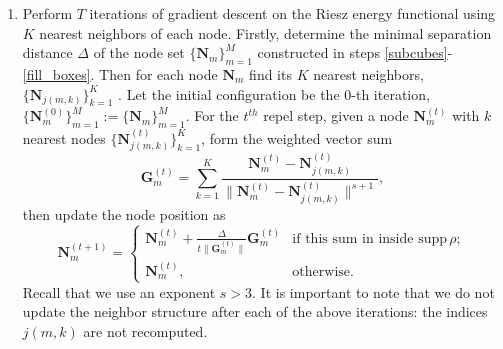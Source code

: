 \documentclass{amsart}
\newcommand{\bs}[1]{\boldsymbol{#1}}
\theoremstyle{definition}
\begin{document}
\begin{enumerate}
	\item Perform $ T $ iterations of gradient descent on the Riesz energy functional using $ K $ nearest neighbors of each node. 
	Firstly, determine the minimal separation distance $ \Delta $ of the node set $ \{\boldsymbol{N}_m\}_{m=1}^M $ constructed in steps \eqref{subcubes}-\eqref{fill_boxes}. Then for each node $ \boldsymbol{N}_m $ find its $ K $ nearest neighbors, $ \{\boldsymbol{N}_{j(m,k)}\}_{k=1}^K $ . Let the initial configuration be the $ 0 $-th iteration, $ \{\boldsymbol{N}_m^{(0)}\}_{m=1}^M := \{\boldsymbol{N}_m\}_{m=1}^M $. For the $t^{th}$ repel step, given a node $\boldsymbol{N}_m^{(t)}$ with $ k $ nearest nodes $\{ \boldsymbol{N}_{j(m,k)}^{(t)}\}_{k=1}^K$, form the weighted vector sum
	\[ \bs{G}_m^{(t)} =\sum_{k=1}^{K}\frac{\boldsymbol{N}_m^{(t)}-\boldsymbol{N}_{j(m,k)}^{(t)} }{\|\boldsymbol{N}_m^{(t)}-\boldsymbol{N}_{j(m,k)}^{(t)} \|^{s+1}}, \]
	then update the node position as
	\begin{equation}\label{node_update}
	\boldsymbol{N}_m^{(t+1)} = \begin{cases}
	\bs{N}_m^{(t)} + \frac{\Delta}{t\|\bs{G}_m^{(t)}\|}\bs{G}_m^{(t)} &\text{if this sum in inside }\text{supp}\,\rho; \\
	\bs{N}_m^{(t)}, &\text{otherwise.}
	\end{cases} 
	\end{equation}
	Recall that we use an exponent $s>3$.
	It is important to note that we do not update the neighbor structure after each of the above iterations: the indices $ j(m,k) $ are not recomputed.
\end{enumerate}
\end{document}
